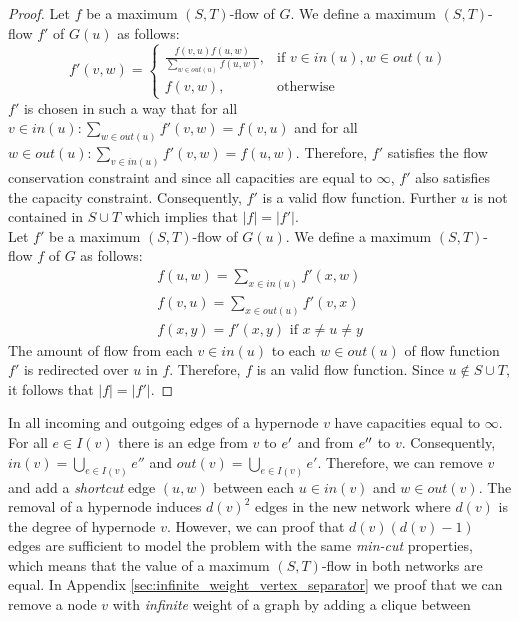 \begin{proof}
Let $f$ be a maximum $(S,T)$-flow of $G$. We define a maximum $(S,T)$-flow $f'$ 
of $G(u)$ as follows:
\begin{equation}
\label{eq:eq1}
f'(v,w) =  
  \begin{cases}
      \frac{f(v,u)f(u,w)}{\sum_{w \in out(u)} f(u,w)}, & \text{if } v \in in(u), w \in out(u) \\
      f(v,w), & \text{otherwise}
   \end{cases} 
\end{equation}
$f'$ is chosen in such a way that for all $v \in in(u): \sum_{w \in out(u)} f'(v,w) = f(v,u)$
and for all $w \in out(u): \sum_{v \in in(u)} f'(v,w) = f(u,w)$. Therefore, $f'$
satisfies the flow conservation constraint and since all capacities are equal to $\infty$, $f'$
also satisfies the capacity constraint. Consequently, $f'$ is a valid flow function. Further
$u$ is not contained in $S\cup T$ which implies that $|f| = |f'|$. \\
Let $f'$ be a maximum $(S,T)$-flow of $G(u)$. We define a maximum $(S,T)$-flow $f$
of $G$ as follows:
\begin{align}
\label{eq:eq2}
f(u,w) = \sum_{x \in in(u)} f'(x,w) \nonumber \\
f(v,u) = \sum_{x \in out(u)} f'(v,x) \\
f(x,y) = f'(x,y) \text{ if } x \neq u \neq y \nonumber
\end{align}
The amount of flow from each $v \in in(u)$ to each $w \in out(u)$ of flow function
$f'$ is redirected over $u$ in $f$. Therefore, $f$ is an valid flow function.
Since $u \notin S\cup T$, it follows that $|f| = |f'|$.
\end{proof}
In  all incoming and outgoing edges of a hypernode $v$ have
capacities equal to $\infty$. For all $e \in I(v)$ there is an edge from $v$
to $e'$ and from $e''$ to $v$. Consequently, $in(v) = \bigcup_{e \in I(v)} e''$
and $out(v) = \bigcup_{e \in I(v)} e'$. Therefore, we can remove $v$ and add a \emph{shortcut} edge $(u,w)$
between each $u \in in(v)$ and $w \in out(v)$. The removal of a hypernode induces $d(v)^2$ edges in the new network where
$d(v)$ is the degree of hypernode $v$. However, we can proof that $d(v)(d(v) - 1)$ edges are
sufficient to model the problem with the same \emph{min-cut} properties, which means that
the value of a maximum $(S,T)$-flow in both networks are equal. In Appendix \ref{sec:infinite_weight_vertex_separator} we
proof that we can remove a node $v$ with \emph{infinite} weight of a graph by adding a clique between 
